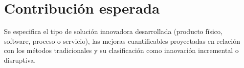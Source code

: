 \section{Contribución esperada}
\label{sec:contribucion_esperada}

Se especifica el tipo de solución innovadora desarrollada (producto físico, software, proceso o servicio), las mejoras cuantificables proyectadas en relación con los métodos tradicionales y su clasificación como innovación incremental o disruptiva.
